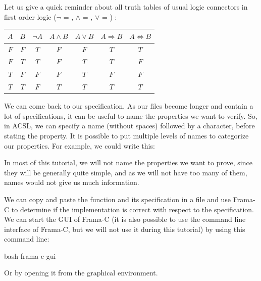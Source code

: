 \begin{Information}
  Let us give a quick reminder about all
  truth tables of usual logic connectors in first order logic
  ($\neg$ = \CodeInline{!}, $\wedge$ = \CodeInline{\&\&}, $\vee$ = \CodeInline{||}) :

\begin{longtabu}{|c|c|c|c|c|c|c|} \hline
$A$ & $B$ & $\neg A$ & $A \wedge B$ & $A \vee B$ & $A \Rightarrow B$ & $A \Leftrightarrow B$ \\ \hline
$F$ & $F$ & $T$ & $F$ & $F$ & $T$ & $T$ \\ \hline
$F$ & $T$ & $T$ & $F$ & $T$ & $T$ & $F$ \\ \hline
$T$ & $F$ & $F$ & $F$ & $T$ & $F$ & $F$ \\ \hline
$T$ & $T$ & $F$ & $T$ & $T$ & $T$ & $T$ \\ \hline
\end{longtabu}
\end{Information}


We can come back to our specification. As our files become longer and
contain a lot of specifications, it can be useful to name the
properties we want to verify. So, in ACSL, we can specify a name
(without spaces) followed by a \CodeInline{:} character, before stating the
property.
It is possible to put multiple levels of names to categorize our
properties. For example, we could write this:






In most of this tutorial, we will not name the properties we want to
prove, since they will be generally quite simple, and as we will not have
too many of them, names would not give us much information.

We can copy and paste the function  and its specification in
a file  and use Frama-C to determine if the implementation
is correct with respect to the specification. We can start the GUI of Frama-C
(it is also possible to use the command line interface of Frama-C, but we
will not use it during this tutorial) by using this command line:



\begin{CodeBlock}{bash}
frama-c-gui
\end{CodeBlock}



Or by opening it from the graphical environment.



